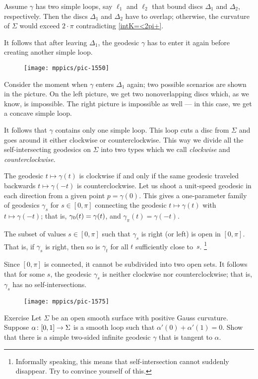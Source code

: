 Assume $\gamma$ has two simple loops, say $\ell_1$ and $\ell_2$ that bound discs $\Delta_1$ and $\Delta_2$, respectively.
Then the discs $\Delta_1$ and $\Delta_2$ have to overlap;
otherwise, the curvature of $\Sigma$ would exceed $2\cdot\pi$  contradicting \ref{intK=<2pi+}.

It follows that after leaving $\Delta_1$, the geodesic $\gamma$ has to enter it again before creating another simple loop.
\begin{figure}[h!]
\vskip-0mm
\centering
\texttt{[image: mppics/pic-1550]}
\end{figure}
Consider the moment when $\gamma$ enters $\Delta_1$ again;
two possible scenarios are shown in the picture.
On the left picture, we get two nonoverlapping discs which, as we know, is impossible.
The right picture is impossible as well --- in this case, we get a concave simple loop.

It follows that $\gamma$ contains only one simple loop.
This loop cuts a disc from $\Sigma$ 
and goes around it either clockwise or counterclockwise.
This way we divide all the self-intersecting geodesics on $\Sigma$
into two types which we call {}\emph{clockwise} and {}\emph{counterclockwise}.

The geodesic $t\mapsto \gamma(t)$ is clockwise 
if and only if the same geodesic traveled backwards
$t\mapsto \gamma(-t)$
is counterclockwise.
Let us shoot a unit-speed geodesic in each direction from a given point $p=\gamma(0)$.
This gives a one-parameter family of geodesics $\gamma_s$ for $s\in[0,\pi]$ connecting the geodesic $t\mapsto \gamma(t)$ with $t\mapsto \gamma(-t)$; that is, $\gamma_0(t)\z=\gamma(t)$, and $\gamma_\pi(t)=\gamma(-t)$.

The subset of values $s\in [0,\pi]$ such that $\gamma_s$ is right (or left) is open in $[0,\pi]$.
That is, if $\gamma_s$ is right, then so is $\gamma_t$ for all $t$ sufficiently close to~$s$.%
\footnote{Informally speaking, this means that self-intersection cannot suddenly disappear. Try to convince yourself of this.}

Since $[0,\pi]$ is connected, it cannot be subdivided into two open sets.
It follows that for some $s$, the geodesic $\gamma_s$ is neither  clockwise nor counterclockwise;
that is, $\gamma_s$ has no self-intersections.
\qeds

{

\begin{wrapfigure}{r}{17 mm}
\vskip-4mm
\centering
\texttt{[image: mppics/pic-1575]}
\end{wrapfigure}

\begin{thm}{Exercise}\label{ex:cohn-vossen}
Let $\Sigma$ be an open smooth surface with positive Gauss curvature.
Suppose $\alpha\:[0,1]\z\to \Sigma$ is a smooth loop such that $\alpha'(0)+\alpha'(1)=0$.
Show that there is a simple two-sided infinite geodesic $\gamma$ that is tangent to $\alpha$.
\end{thm}

}

